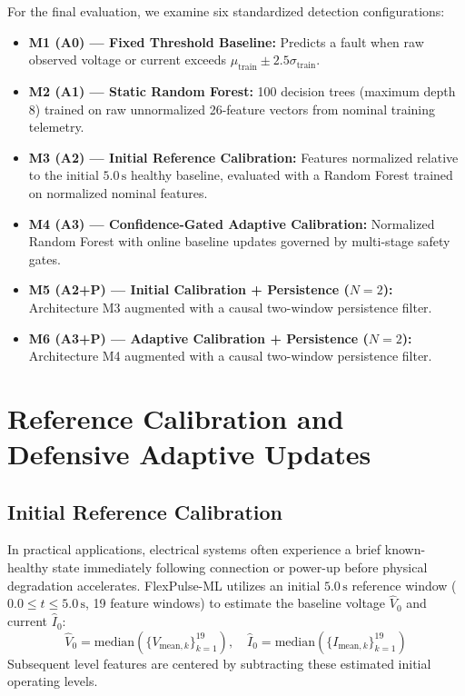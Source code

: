 \documentclass[conference]{IEEEtran}
\begin{document}
For the final evaluation, we examine six standardized detection configurations:
\begin{itemize}
    \item \textbf{M1 (A0) --- Fixed Threshold Baseline:} Predicts a fault when raw observed voltage or current exceeds $\mu_{\text{train}} \pm 2.5\sigma_{\text{train}}$.
    \item \textbf{M2 (A1) --- Static Random Forest:} 100 decision trees (maximum depth 8) trained on raw unnormalized 26-feature vectors from nominal training telemetry.
    \item \textbf{M3 (A2) --- Initial Reference Calibration:} Features normalized relative to the initial $5.0\,\text{s}$ healthy baseline, evaluated with a Random Forest trained on normalized nominal features.
    \item \textbf{M4 (A3) --- Confidence-Gated Adaptive Calibration:} Normalized Random Forest with online baseline updates governed by multi-stage safety gates.
    \item \textbf{M5 (A2+P) --- Initial Calibration + Persistence ($N=2$):} Architecture M3 augmented with a causal two-window persistence filter.
    \item \textbf{M6 (A3+P) --- Adaptive Calibration + Persistence ($N=2$):} Architecture M4 augmented with a causal two-window persistence filter.
\end{itemize}

\section{Reference Calibration and Defensive Adaptive Updates}

\subsection{Initial Reference Calibration}
In practical applications, electrical systems often experience a brief known-healthy state immediately following connection or power-up before physical degradation accelerates. FlexPulse-ML utilizes an initial $5.0\,\text{s}$ reference window ($0.0 \le t \le 5.0\,\text{s}$, 19 feature windows) to estimate the baseline voltage $\hat{V}_0$ and current $\hat{I}_0$:
\begin{equation}
\hat{V}_0 = \text{median}(\{V_{\text{mean}, k}\}_{k=1}^{19}), \quad \hat{I}_0 = \text{median}(\{I_{\text{mean}, k}\}_{k=1}^{19})
\label{eq:calib}
\end{equation}
Subsequent level features are centered by subtracting these estimated initial operating levels.
\end{document}
